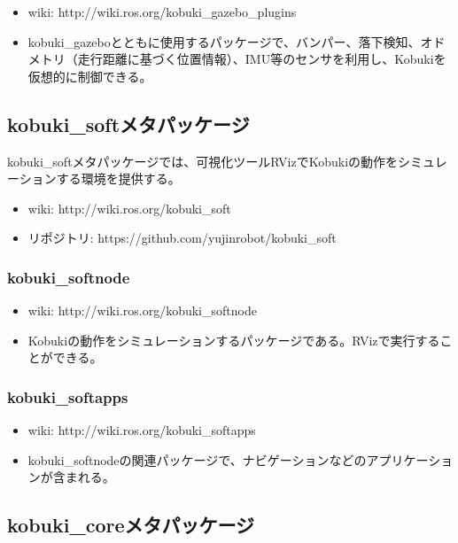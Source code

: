 \begin{itemize}
\item wiki: http://wiki.ros.org/kobuki\_gazebo\_plugins
\item kobuki\_gazeboとともに使用するパッケージで、バンパー、落下検知、オドメトリ（走行距離に基づく位置情報）、IMU等のセンサを利用し、Kobukiを仮想的に制御できる。
\end{itemize}

\subsection{kobuki\_softメタパッケージ}

kobuki\_softメタパッケージでは、可視化ツールRVizでKobukiの動作をシミュレーションする環境を提供する。

\begin{itemize}
\item wiki: http://wiki.ros.org/kobuki\_soft
\item リポジトリ: https://github.com/yujinrobot/kobuki\_soft
\end{itemize}

\subsubsection{kobuki\_softnode}

\begin{itemize}
\item wiki: http://wiki.ros.org/kobuki\_softnode
\item Kobukiの動作をシミュレーションするパッケージである。RVizで実行することができる。
\end{itemize}

\subsubsection{kobuki\_softapps}

\begin{itemize}
\item wiki: http://wiki.ros.org/kobuki\_softapps
\item kobuki\_softnodeの関連パッケージで、ナビゲーションなどのアプリケーションが含まれる。
\end{itemize}

\subsection{kobuki\_coreメタパッケージ}

